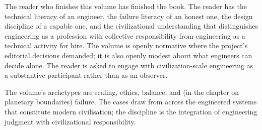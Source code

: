 The reader who finishes this volume has finished the book. The reader has the technical literacy of an engineer, the failure literacy of an honest one, the design discipline of a capable one, and the civilizational understanding that distinguishes engineering as a profession with collective responsibility from engineering as a technical activity for hire. The volume is openly normative where the project's editorial decisions demanded; it is also openly modest about what engineers can decide alone. The reader is asked to engage with civilization-scale engineering as a substantive participant rather than as an observer.

The volume's archetypes are scaling, ethics, balance, and (in the chapter on planetary boundaries) failure. The cases draw from across the engineered systems that constitute modern civilisation; the discipline is the integration of engineering judgment with civilizational responsibility.

\vspace{1cm}
